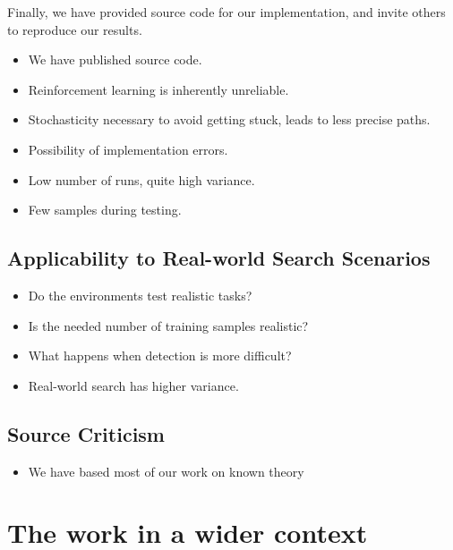 Finally, we have provided source code for our implementation, and invite others to reproduce our results.

\begin{itemize}
    \item We have published source code.
    \item Reinforcement learning is inherently unreliable.
    \item Stochasticity necessary to avoid getting stuck, leads to less precise paths.
    \item Possibility of implementation errors.
    \item Low number of runs, quite high variance.
    \item Few samples during testing.
\end{itemize}

\subsection{Applicability to Real-world Search Scenarios}

\begin{itemize}
    \item Do the environments test realistic tasks?
    \item Is the needed number of training samples realistic?
    \item What happens when detection is more difficult?
    \item Real-world search has higher variance.
\end{itemize}


\subsection{Source Criticism}

\begin{itemize}
    \item We have based most of our work on known theory
\end{itemize}



\section{The work in a wider context}
\label{sec:discussion-wider}

% 

